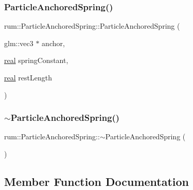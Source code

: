 \subsubsection{\texorpdfstring{Particle\+Anchored\+Spring()}{ParticleAnchoredSpring()}}
{\footnotesize\ttfamily rum\+::\+Particle\+Anchored\+Spring\+::\+Particle\+Anchored\+Spring (\begin{DoxyParamCaption}\item[{glm\+::vec3 $\ast$}]{anchor,  }\item[{\hyperlink{namespacerum_a7e8cca23573d5eaead0f138cbaa4862c}{real}}]{spring\+Constant,  }\item[{\hyperlink{namespacerum_a7e8cca23573d5eaead0f138cbaa4862c}{real}}]{rest\+Length }\end{DoxyParamCaption})\hspace{0.3cm}{\ttfamily [explicit]}}

\mbox{\label{classrum_1_1_particle_anchored_spring_a590f7f2dbb306ba4ac5cb7963c8dbf22}} 
\subsubsection{\texorpdfstring{$\sim$\+Particle\+Anchored\+Spring()}{~ParticleAnchoredSpring()}}
{\footnotesize\ttfamily rum\+::\+Particle\+Anchored\+Spring\+::$\sim$\+Particle\+Anchored\+Spring (\begin{DoxyParamCaption}{ }\end{DoxyParamCaption})}



\subsection{Member Function Documentation}
\mbox{\label{classrum_1_1_particle_anchored_spring_aa4fcab6f3de51c6b89f3a65b80814cc6}} 
